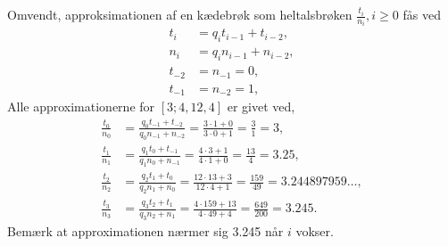 Omvendt, approksimationen af en kædebrøk som heltalsbrøken $\frac{t_i}{n_i}, i \geq 0$ fås ved
\begin{align}
  t_i &= q_it_{i-1}+t_{i-2},
  \\n_i &= q_in_{i-1}+n_{i-2},
  \\t_{-2} &= n_{-1} = 0,
  \\t_{-1} &= n_{-2} =1,
\end{align}
Alle approximationerne for $[3; 4, 12, 4]$ er givet ved,
\begin{align}
  \frac{t_0}{n_0} &= \frac{q_0t_{-1} + t_{-2}}{q_0n_{-1}+n_{-2}} = \frac{3\cdot 1+0}{3\cdot 0 + 1} = \frac{3}{1} = 3,
  \\\frac{t_1}{n_1} &= \frac{q_1t_0 + t_{-1}}{q_1n_0+n_{-1}} = \frac{4\cdot 3 + 1}{4\cdot 1+0} = \frac{13}{4} = 3.25,
  \\\frac{t_2}{n_2} &= \frac{q_2t_1 + t_{0}}{q_2n_1+n_{0}} = \frac{12\cdot 13 + 3}{12\cdot 4 + 1} = \frac{159}{49} = 3.244897959\ldots,
  \\\frac{t_3}{n_3} &= \frac{q_3t_2 + t_{1}}{q_3n_2+n_{1}} = \frac{4\cdot 159 + 13}{4\cdot 49+4} = \frac{649}{200} = 3.245.
\end{align}
Bemærk at approximationen nærmer sig 3.245 når $i$ vokser.
